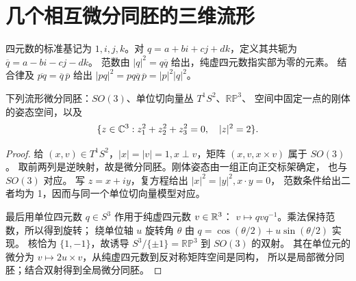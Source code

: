 \section{几个相互微分同胚的三维流形}
\begin{definition}[四元数的共轭与范数]
四元数的标准基记为 $1,i,j,k$。对 $q=a+bi+cj+dk$，定义其共轭为
$\overline q=a-bi-cj-dk$。
范数由 $|q|^2=q\overline q$ 给出，纯虚四元数指实部为零的元素。
结合律及 $\overline{pq}=\overline q\,\overline p$ 给出
$|pq|^2=pq\overline q\,\overline p=|p|^2|q|^2$。
\end{definition}
\begin{proposition}
下列流形微分同胚：$SO(3)$、单位切向量丛 $T^1S^2$、$\mathbb{RP}^3$、
空间中固定一点的刚体的姿态空间，以及
\[
 \{z\in\mathbb{C}^3:z_1^2+z_2^2+z_3^2=0,\quad |z|^2=2\}.
\]
\end{proposition}
\begin{proof}
给 $(x,v)\in T^1S^2$，$|x|=|v|=1,x\perp v$，矩阵 $(x,v,x\times v)$ 属于 $SO(3)$。
取前两列是逆映射，故是微分同胚。刚体姿态由一组正向正交标架确定，
也与 $SO(3)$ 对应。
写 $z=x+iy$，复方程给出 $|x|^2=|y|^2,x\cdot y=0$，
范数条件给出二者均为 1，因而与同一个单位切向量模型对应。

最后用单位四元数 $q\in S^3$ 作用于纯虚四元数 $v\in\mathbb{R}^3$：
$v\mapsto qvq^{-1}$。乘法保持范数，所以得到旋转；
绕单位轴 $u$ 旋转角 $\theta$ 由 $q=\cos(\theta/2)+u\sin(\theta/2)$ 实现。
核恰为 $\{1,-1\}$，故诱导 $S^3/\{\pm1\}=\mathbb{RP}^3$ 到 $SO(3)$ 的双射。
其在单位元的微分为 $v\mapsto2u\times v$，从纯虚四元数到反对称矩阵空间是同构，
所以是局部微分同胚；结合双射得到全局微分同胚。
\end{proof}

